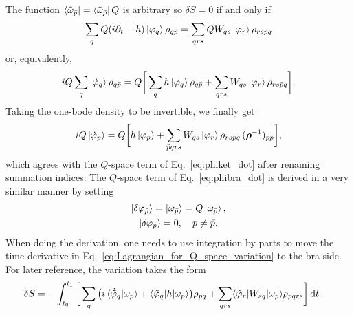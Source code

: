 \documentclass[aip,jcp,preprint,superscriptaddress,nofootinbib]{revtex4-1}
\begin{document}
The function $\bra{\tilde{\omega}_{\bar{p}}} = \bra{\tilde{\omega}_{\bar{p}}} Q$ is
arbitrary so $\delta S = 0$ if and only if
\begin{align}
    \sum_{q} Q (i \partial_t - h) \ket{\varphi_{q}} \rho_{q\bar{p}}
    = \sum_{qrs} Q W_{qs} \ket{\varphi_{r}} \rho_{rs\bar{p}q}
\end{align}
or, equivalently,
\begin{align}
    i Q \sum_{q} \ket{\dot{\varphi}_{q}} \rho_{q\bar{p}}
    = 
    Q \bigg[ \sum_{q} h \ket{\varphi_{q}} \rho_{q\bar{p}}
    + \sum_{qrs} W_{qs} \ket{\varphi_{r}} \rho_{rs\bar{p}q} \bigg].
\end{align}
Taking the one-bode density to be invertible, we finally get
\begin{align}
    i Q \ket{\dot{\varphi}_{p}}
    = 
    Q \bigg[ h \ket{\varphi_{p}}
    + \sum_{\bar{p}qrs} W_{qs} \ket{\varphi_{r}} \rho_{rs\bar{p}q} \, (\bm{\rho}^{-1})_{\bar{p}p} \bigg],
\end{align}
which agrees with the $Q$-space term of Eq.~\eqref{eq:phiket_dot} after renaming summation indices.
The $Q$-space term of Eq.~\eqref{eq:phibra_dot} is derived in a very similar manner by setting
\begin{subequations}
    \begin{gather}
        \ket{\delta\varphi_{\bar{p}}} = \ket{\omega_{\bar{p}}} = Q \ket{\omega_{\bar{p}}}, \\
        \ket{\delta\varphi_{p}}  = 0, \quad p \neq \bar{p}.
    \end{gather}
\end{subequations}
When doing the derivation, one needs to use integration by parts 
to move the time derivative in Eq.~\eqref{eq:Lagrangian_for_Q_space_variation}
to the bra side. For later reference, the variation takes the form
\begin{align} \label{eq:Q_space_variation_ket}
    \delta S 
    &=
    -\int_{t_0}^{t_1}
    \bigg[
        \sum_{q} \big( i \braket{\dot{\tilde{\varphi}}_{q} | \omega_{\bar{p}}} + \langle \tilde{\varphi}_{q} \vert h \vert \omega_{\bar{p}} \rangle
        \big) \rho_{\bar{p}q}
        + \sum_{qrs} \langle \tilde{\varphi}_{r} \vert  W_{sq}  \vert \omega_{\bar{p}} \rangle \rho_{\bar{p}qrs}
    \bigg] \dd{t}.
\end{align}
\end{document}
